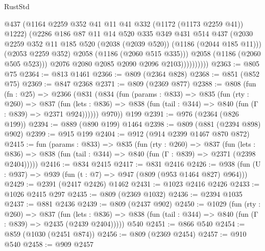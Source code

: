 \begin{lexlean}{RustStd}
\begin{coremodule}
                          @437
                          (@1164 @2259 @352 @41 @11 @41 @332 (@1172 (@1173 @2259 @41)) @1222)
                          (@2286
                            @186
                            @87
                            @11
                            @14
                            @520
                            @335
                            @349
                            @431
                            @514
                            @437
                            (@2030
                              @2259
                              @352
                              @11
                              @185
                              @520
                              (@2038 (@2039 @520))
                              (@1186 (@2044 @185 @11)))
                            (@2053 @2259 @352)
                            @2058
                            (@1186 (@2060 @515 @335)))
                          @2058
                          (@1186 (@2060 @505 @523)))
                        @2076
                        @2080
                        @2085
                        @2090
                        @2096
                        @2103))))))))))
@2363 := @805 @75
@2364 := @813 @1461
@2366 := @809 (@2364 @828)
@2368 := @851 (@852 @75)
@2369 := @847 @2368
@2371 := @809 (@2369 @877)
@2388 := @808
    (fun (fn : @25) =>
    @2366
      (@831
        (@834
          (fun (params : @833) =>
          @835
            (fun (rty : @260) =>
            @837
              (fun (lets : @836) =>
              @838 (fun (tail : @344) => @840 (fun (Γ : @839) => @2371 @924))))))
        @970))
    @199
@2391 := @976 (@2364 (@826 @199))
@2394 := @889 (@890 @199) @1464
@2398 := @809 (@881 (@2394 @898) @902)
@2399 := @915 @199
@2404 := @912 (@914 @2399 @1467 @870 @872)
@2415 := fun (params : @833) =>
  @835
    (fun (rty : @260) =>
    @837
      (fun (lets : @836) =>
      @838 (fun (tail : @344) => @840 (fun (Γ : @839) => @2371 (@2398 @2404)))))
@2416 := @834 @2415
@2417 := @831 @2416
@2426 := @938 (fun (U : @937) => @939 (fun (t : @7) => @947 (@809 (@953 @1464 @827) @964)))
@2429 := @2391 (@2417 @2426) @1462
@2431 := @1023 @2416 @2426
@2433 := @1026 @2415 @297
@2435 := @809 (@2369 @1032)
@2436 := @2394 @1035
@2437 := @881 @2436
@2439 := @809 (@2437 @902)
@2450 := @1029
    (fun (rty : @260) =>
    @837
      (fun (lets : @836) =>
      @838 (fun (tail : @344) => @840 (fun (Γ : @839) => @2435 (@2439 @2404)))))
    @540
@2451 := @866 @540
@2454 := @859 (@1030 (@2451 @874))
@2456 := @809 (@2369 @2454)
@2457 := @910 @540
@2458 := @909 @2457

\end{coremodule}
\end{lexlean}
